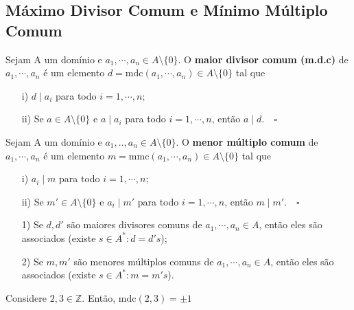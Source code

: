 \documentclass[AlgebraII/algebraII_notes.tex]{subfiles}
\begin{document}
\subsection{Máximo Divisor Comum e Mínimo Múltiplo Comum}
\begin{def*}
	Sejam A um domínio e \(a_{1}, \cdots, a_{n}\in A\setminus{\{0\}}\). O \textbf{maior divisor comum (m.d.c)} de \(a_{1}, \cdots, a_{n}\)
	é um elemento \(d = \mathrm{mdc}(a_{1}, \cdots, a_{n})\in A\setminus{\{0\}}\) tal que
	\begin{itemize}
		\item[i)] \(d\mid a_{i}\) para todo \(i = 1, \cdots, n;\)
		\item[ii)] Se \(a\in A\setminus{\{0\}}\) e \(a\mid a_{i}\) para todo \(i=1, \cdots, n\), então \(a\mid d.\quad\square\)
	\end{itemize}
\end{def*}
\begin{def*}
	Sejam A um domínio e \(a_{1}, . ., a_{n}\in A\setminus{\{0\}}\). O \textbf{menor múltiplo comum} de \(a_{1}, \cdots, a_{n}\) é um elemento
	\(m = \mathrm{mmc}(a_{1}, \cdots, a_{n})\in A\setminus{\{0\}}\) tal que
	\begin{itemize}
		\item[i)] \(a_{i}\mid m\) para todo \(i=1, \cdots, n\);
		\item[ii)] Se \(m'\in A\setminus{\{0\}}\) e \(a_{i}\mid m'\) para todo \(i=1, \cdots, n\), então \(m\mid m'.\quad\square\)
	\end{itemize}
\end{def*}
\begin{prop*}
	\begin{itemize}
		\item[1)] Se \(d, d'\) são maiores divisores comuns de \(a_{1}, \cdots, a_{n}\in A\), então eles são associados (existe \(s\in A^{*}: d = d's\));
		\item[2)] Se \(m, m'\) são menores múltiplos comuns de \(a_{1}, \cdots, a_{n}\in A\), então eles são associados (existe \(s\in A^{*}: m = m's\)).
	\end{itemize}
\end{prop*}
\begin{example}
	Considere \(2, 3\in \mathbb{Z}.\) Então, \(\mathrm{mdc}(2, 3) = \pm1\)
\end{example}
\end{document}

